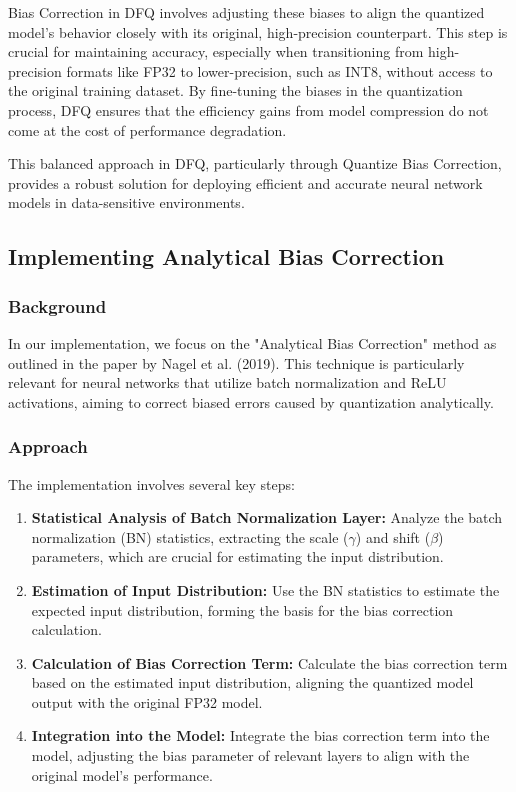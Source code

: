 \documentclass[10pt]{article}
\begin{document}
Bias Correction in DFQ involves adjusting these biases to align the quantized model's behavior closely with its original, high-precision counterpart. This step is crucial for maintaining accuracy, especially when transitioning from high-precision formats like FP32 to lower-precision, such as INT8, without access to the original training dataset. By fine-tuning the biases in the quantization process, DFQ ensures that the efficiency gains from model compression do not come at the cost of performance degradation.

This balanced approach in DFQ, particularly through Quantize Bias Correction, provides a robust solution for deploying efficient and accurate neural network models in data-sensitive environments.

\subsection{Implementing Analytical Bias Correction}

\subsubsection{Background}
In our implementation, we focus on the "Analytical Bias Correction" method as outlined in the paper by Nagel et al. (2019). This technique is particularly relevant for neural networks that utilize batch normalization and ReLU activations, aiming to correct biased errors caused by quantization analytically.

\subsubsection{Approach}
The implementation involves several key steps:

\begin{enumerate}
    \item \textbf{Statistical Analysis of Batch Normalization Layer:} Analyze the batch normalization (BN) statistics, extracting the scale (\(\gamma\)) and shift (\(\beta\)) parameters, which are crucial for estimating the input distribution.
    \item \textbf{Estimation of Input Distribution:} Use the BN statistics to estimate the expected input distribution, forming the basis for the bias correction calculation.
    \item \textbf{Calculation of Bias Correction Term:} Calculate the bias correction term based on the estimated input distribution, aligning the quantized model output with the original FP32 model.
    \item \textbf{Integration into the Model:} Integrate the bias correction term into the model, adjusting the bias parameter of relevant layers to align with the original model's performance.
\end{enumerate}
\end{document}
